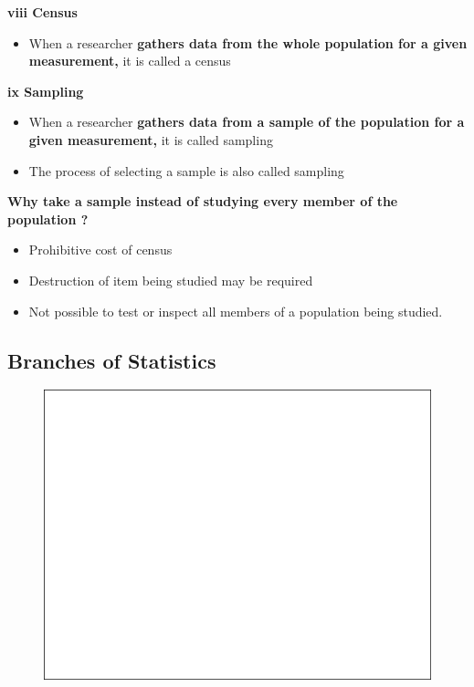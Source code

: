 \documentclass[]{book}
\providecommand{\tightlist}{%
  \setlength{\itemsep}{0pt}\setlength{\parskip}{0pt}}
\begin{document}
\textbf{viii Census}

\begin{itemize}
\tightlist
\item
  When a researcher \textbf{gathers data from the whole population for a given measurement,} it is called a census
\end{itemize}

\textbf{ix Sampling}

\begin{itemize}
\tightlist
\item
  When a researcher \textbf{gathers data from a sample of the population for a given measurement,} it is called sampling
\item
  The process of selecting a sample is also called sampling
\end{itemize}

\textbf{Why take a sample instead of studying every member of the population ?}

\begin{itemize}
\tightlist
\item
  Prohibitive cost of census
\item
  Destruction of item being studied may be required
\item
  Not possible to test or inspect all members of a population being studied.
\end{itemize}

\hypertarget{branches-of-statistics}{%
\subsection{Branches of Statistics}\label{branches-of-statistics}}

\begin{figure}

{\centering \includegraphics[width=1\linewidth]{figure/box1-1} 

}

\end{figure}
\end{document}
